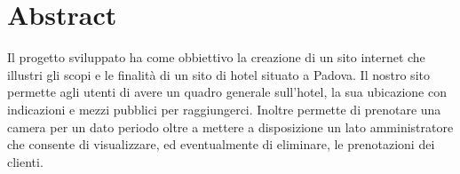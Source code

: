 \section{Abstract}
Il progetto sviluppato ha come obbiettivo la creazione di un sito internet che illustri gli scopi e le finalità di un sito di hotel situato a Padova.
Il nostro sito permette agli utenti di avere un quadro generale sull'hotel, la sua ubicazione con indicazioni e mezzi pubblici per raggiungerci. Inoltre permette di prenotare una camera per un dato periodo oltre a mettere a disposizione un lato amministratore che consente di visualizzare, ed eventualmente di eliminare, le prenotazioni dei clienti.
